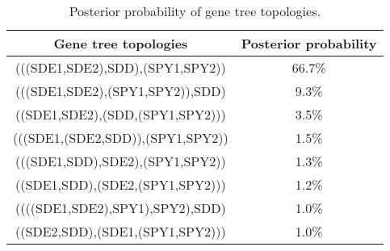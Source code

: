\documentclass[english]{article}
\providecommand{\tabularnewline}{\\}
\begin{document}
\begin{table}
\caption{\label{tab:Gene-tree-topologies}Posterior probability of gene tree
topologies.}
\noindent \begin{centering}
\begin{tabular}{cc}
\hline 
Gene tree topologies & Posterior probability\tabularnewline
\hline
(((SDE1,SDE2),SDD),(SPY1,SPY2)) & 66.7\%\tabularnewline
(((SDE1,SDE2),(SPY1,SPY2)),SDD) & 9.3\%\tabularnewline
((SDE1,SDE2),(SDD,(SPY1,SPY2))) & 3.5\%\tabularnewline
(((SDE1,(SDE2,SDD)),(SPY1,SPY2)) & 1.5\%\tabularnewline
(((SDE1,SDD),SDE2),(SPY1,SPY2)) & 1.3\%\tabularnewline
((SDE1,SDD),(SDE2,(SPY1,SPY2))) & 1.2\%\tabularnewline
((((SDE1,SDE2),SPY1),SPY2),SDD) & 1.0\%\tabularnewline
((SDE2,SDD),(SDE1,(SPY1,SPY2))) & 1.0\%\tabularnewline
\hline
\end{tabular}
\par\end{centering}
\end{table}
\clearpage{}
\end{document}
